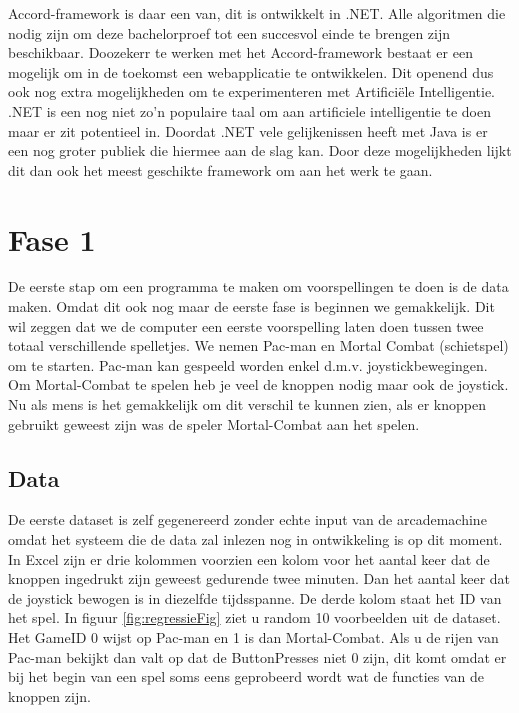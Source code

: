 Accord-framework is daar een van, dit is ontwikkelt in .NET. Alle algoritmen die nodig zijn om deze bachelorproef tot een succesvol einde te brengen zijn beschikbaar. \newline
Doozekerr te werken met het Accord-framework bestaat er een mogelijk om in de toekomst een webapplicatie te ontwikkelen. Dit openend dus ook nog extra mogelijkheden om te experimenteren met Artificiële Intelligentie. 
\newline
.NET is een nog niet zo'n populaire taal om aan artificiele intelligentie te doen maar er zit potentieel in. Doordat .NET vele gelijkenissen heeft met Java is er een nog groter publiek die hiermee aan de slag kan.
\newline
Door deze mogelijkheden lijkt dit dan ook het meest geschikte framework om aan het werk te gaan. 

\section{Fase 1}
\label{sec:Fase1}
De eerste stap om een programma te maken om voorspellingen te doen is de data maken. Omdat dit ook nog maar de eerste fase is beginnen we gemakkelijk. Dit wil zeggen dat we de computer een eerste voorspelling laten doen tussen twee totaal verschillende spelletjes. We nemen Pac-man en Mortal Combat (schietspel) om te starten. Pac-man kan gespeeld worden enkel d.m.v. joystickbewegingen. Om Mortal-Combat te spelen heb je veel de knoppen nodig maar ook de joystick.  Nu als mens is het gemakkelijk om dit verschil te kunnen zien, als er knoppen gebruikt geweest zijn was de speler Mortal-Combat aan het spelen. 

\subsection{Data}
\label{sec:DataFase1}
De eerste dataset is zelf gegenereerd zonder echte input van de arcademachine omdat het systeem die de data zal inlezen nog in ontwikkeling is op dit moment. 
In Excel zijn er drie kolommen voorzien een kolom voor het aantal keer dat de knoppen ingedrukt zijn geweest gedurende twee minuten. Dan het aantal keer dat de joystick bewogen is in diezelfde tijdsspanne. De derde kolom staat het ID van het spel. 
In figuur \ref{fig:regressieFig} ziet u random 10 voorbeelden uit de dataset.
Het GameID 0 wijst op Pac-man en 1 is dan Mortal-Combat. Als u de rijen van Pac-man bekijkt dan valt op dat de ButtonPresses niet 0 zijn, dit komt omdat er bij het begin van een spel soms eens geprobeerd wordt wat de functies van de knoppen zijn. 

